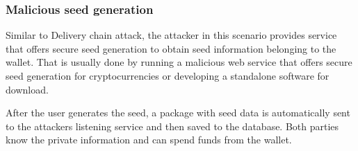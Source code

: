 \documentclass[
  printed, %
  table,   %
  lof,     %
  lot,     %
           oneside, color
]{fithesis3}
\begin{document}
\subsubsection{Malicious seed generation}

Similar to Delivery chain attack, the attacker in this scenario provides service that offers secure seed generation to obtain seed information belonging to the wallet. That is usually done by running a malicious web service that offers secure seed generation for cryptocurrencies or developing a standalone software for download. 
 
After the user generates the seed, a package with seed data is automatically sent to the attackers listening service and then saved to the database. Both parties know the private information and can spend funds from the wallet.
\end{document}
